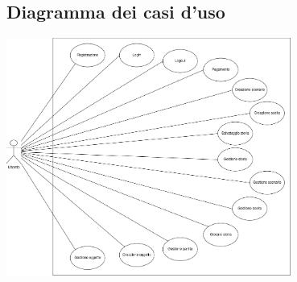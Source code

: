 \documentclass{article}
\begin{document}
\subsection{Diagramma dei casi d'uso}
\large
\begin{center}
    \includegraphics[width=0.7\textwidth]{foto2.png}
\end{center}
\end{document}
